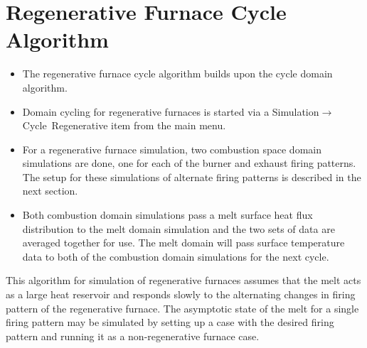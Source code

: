 \documentclass[12pt]{article}
\newcommand{\smenu}[2]{\textsf{#1$\to$#2}}
\numberwithin{equation}{section}
\begin{document}
\section{Regenerative Furnace Cycle Algorithm}
\label{sec:regen}
\noindent
\begin{itemize}
\item The regenerative furnace cycle algorithm builds upon the cycle domain algorithm.
\item Domain cycling for regenerative furnaces is started via a \smenu{Simulation}{Cycle~Regenerative} item from the main menu.
\item  For a regenerative furnace simulation, two combustion space domain simulations are done, one for each of the burner and exhaust firing patterns. The setup for these simulations of alternate firing patterns is described in the next section.
\item  Both combustion domain simulations pass a melt surface heat flux distribution to the melt domain simulation and the two sets of data are averaged together for use. The melt domain will pass surface temperature data to both of the combustion domain simulations for the next cycle.
\end{itemize}

\noindent
This algorithm for simulation of regenerative furnaces assumes that the melt acts as a large heat reservoir and responds slowly to the alternating changes in firing pattern of the regenerative furnace. The asymptotic state of the melt for a single firing pattern may be simulated by setting up a case with the desired firing pattern and running it as a non-regenerative furnace case.
\newpage
\end{document}

